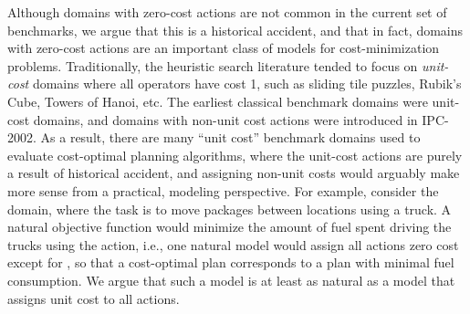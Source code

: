 Although domains with zero-cost actions are not common in the current set of benchmarks, we argue that this is a historical accident, and that in fact, domains with zero-cost actions are an important class of models for cost-minimization problems.
% 
Traditionally, the heuristic search literature tended to focus on \emph{unit-cost} domains where all operators have cost 1, such as sliding tile puzzles, Rubik's Cube, Towers of Hanoi, etc.
% 
The earliest classical benchmark domains were unit-cost domains, and domains with non-unit cost actions  were introduced in  IPC-2002. 
As a result, there are many ``unit cost'' benchmark domains used to evaluate 
cost-optimal planning algorithms, where the unit-cost actions are purely a result of historical accident, and assigning non-unit costs would arguably make more sense from a practical, modeling perspective. 
For example, consider the   domain, where the task is to move packages between locations using a truck. 
A natural objective function would minimize the amount of fuel spent driving the trucks using the  action, 
i.e., one natural model would assign all actions zero cost except for , so that a cost-optimal plan corresponds to a plan with minimal fuel consumption.
We argue that such a model is at least as natural as a model that assigns unit cost to all actions.






